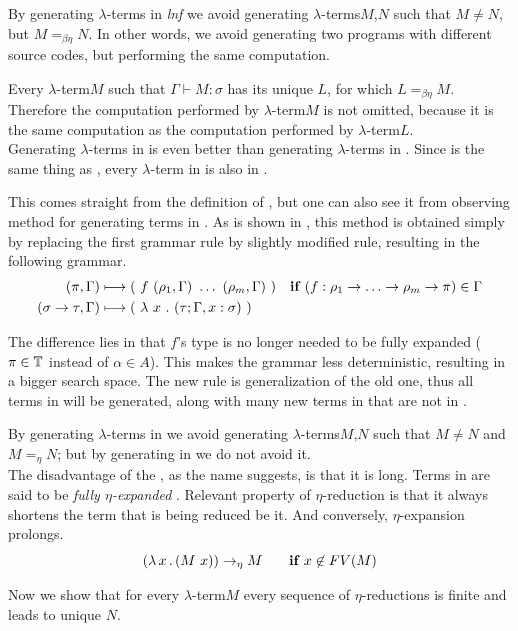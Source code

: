 \documentclass[12pt,a4paper]{report}
\newcommand{\lterm}{$\lambda$-term\xspace}
\newcommand{\lterms}{$\lambda$-terms\xspace}
\newcommand{\turst}[3]{$#1\vdash{}#2:#3$\xspace}
\newcommand{\GMS}{\turst{\Gamma}{M}{\sigma}}
\begin{document}
By generating \lterms in \textit{lnf} we avoid generating 
\lterms $M$,$N$ such that $M \not= N$, but $M =_{\beta\eta} N$.
In other words, we avoid generating two programs with different 
source codes, but performing the same computation.

Every \lterm $M$ such that \GMS has its unique \lnf $L$, 
for which $L =_{\beta\eta} M$.
Therefore the computation performed by \lterm $M$ 
is not omitted, because it is the same computation
as the computation performed by \lterm $L$. \\

Generating \lterms in \lnf is even better than generating 
\lterms in \bnf. Since \lnf is the same thing as \beenf,
every \lterm in \lnf is also in \bnf. 

This comes straight from the definition of \beenf, 
but one can also see it from observing method for generating
terms in \bnf. As is shown in \cite{barendregt10}, 
this method is obtained simply by replacing  
the first grammar rule by slightly modified rule,
resulting in the following grammar.
\begin{align*}
( \pi , \Gamma )  
&\gar
(~f~( \rho_1 , \Gamma )~\dots~( \rho_m , \Gamma )~)
& \textbf{if } (f : \rho_1 \ar \dots \ar \rho_m \ar \pi) \in \Gamma
\\ 
( \sigma \rightarrow \tau , \Gamma )  
&\gar
(~\lambda~x~.~( \tau ; \Gamma,x:\sigma )~)
&   
\end{align*}

The difference lies in that $f$'s type is no longer needed to be fully expanded
($\pi \in \mathbb{T}$ instead of $\alpha \in A$). This makes the grammar less deterministic,
resulting in a bigger search space. The new rule is generalization of the old one,
thus all terms in \lnf will be generated, along with many new terms in \bnf that 
are not in \lnf. 
    
By generating \lterms in \lnf we avoid generating 
\lterms $M$,$N$ such that $M \not= N$ and $M =_{\eta} N$; 
but by generating in \bnf we do not avoid it.\\


The disadvantage of the \lnf, as the name suggests, is that it is long.
Terms in \lnf are said to be \textit{fully $\eta$-expanded} \cite{barendregt10}. 
Relevant property of $\eta$-reduction is that it always shortens the term
that is being reduced be it. And conversely, $\eta$-expansion prolongs.
$$( \lambda \, x \, . \, (M~x) ) \rightarrow_\eta M \textbf{ ~~~~if } x \not\in FV(M) $$

Now we show that for every \lterm $M$ 
every sequence of $\eta$-reductions is finite and
leads to unique \enf $N$.
\end{document}
